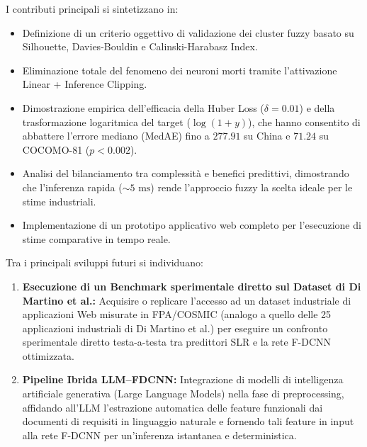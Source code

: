 \documentclass[11pt, a4paper]{article}
\begin{document}
I contributi principali si sintetizzano in:
\begin{itemize}
    \item Definizione di un criterio oggettivo di validazione dei cluster fuzzy basato su Silhouette, Davies-Bouldin e Calinski-Harabasz Index.
    \item Eliminazione totale del fenomeno dei neuroni morti tramite l'attivazione Linear + Inference Clipping.
    \item Dimostrazione empirica dell'efficacia della Huber Loss ($\delta=0.01$) e della trasformazione logaritmica del target ($\log(1+y)$), che hanno consentito di abbattere l'errore mediano (MedAE) fino a $277.91$ su China e $71.24$ su COCOMO-81 ($p < 0.002$).
    \item Analisi del bilanciamento tra complessità e benefici predittivi, dimostrando che l'inferenza rapida ($\sim 5\text{ ms}$) rende l'approccio fuzzy la scelta ideale per le stime industriali.
    \item Implementazione di un prototipo applicativo web completo per l'esecuzione di stime comparative in tempo reale.
\end{itemize}

Tra i principali sviluppi futuri si individuano:
\begin{enumerate}
    \item \textbf{Esecuzione di un Benchmark sperimentale diretto sul Dataset di Di Martino et al.:} Acquisire o replicare l'accesso ad un dataset industriale di applicazioni Web misurate in FPA/COSMIC (analogo a quello delle 25 applicazioni industriali di Di Martino et al.) per eseguire un confronto sperimentale diretto testa-a-testa tra predittori SLR e la rete F-DCNN ottimizzata.
    \item \textbf{Pipeline Ibrida LLM--FDCNN:} Integrazione di modelli di intelligenza artificiale generativa (Large Language Models) nella fase di preprocessing, affidando all'LLM l'estrazione automatica delle feature funzionali dai documenti di requisiti in linguaggio naturale e fornendo tali feature in input alla rete F-DCNN per un'inferenza istantanea e deterministica.
\end{enumerate}



\end{document}
